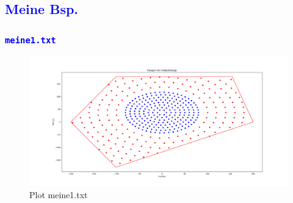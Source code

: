 \documentclass{article}
\begin{document}
\subsection{\textcolor{blue}{Meine Bsp.}}
\subsubsection{\textcolor{blue}{\texttt{meine1.txt}}}
\begin{figure}[H]
    \centering
    \includegraphics[width=1\textwidth]{Bilder/Figure_6.png}
    \caption{Plot meine1.txt}
\end{figure}
\end{document}
